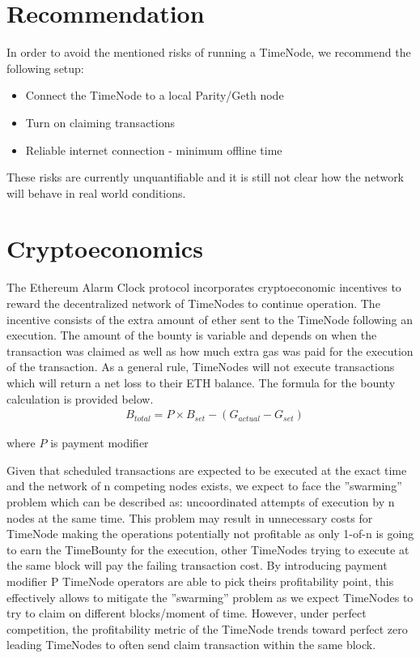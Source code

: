 \documentclass{report}
\begin{document}
  \section{Recommendation}
  In order to avoid the mentioned risks of running a TimeNode, we recommend the following setup:
  \begin{itemize}
    \item Connect the TimeNode to a local Parity/Geth node
    \item Turn on claiming transactions
    \item Reliable internet connection - minimum offline time
  \end{itemize}

  These risks are currently unquantifiable and it is still not clear how the network will behave in real world conditions.

  \section{Cryptoeconomics}
  The Ethereum Alarm Clock protocol incorporates cryptoeconomic incentives to reward the decentralized network of TimeNodes to continue operation. The incentive consists of the extra amount of ether sent to the TimeNode following an execution. The amount of the bounty is variable and depends on when the transaction was claimed as well as how much extra gas was paid for the execution of the transaction. As a general rule, TimeNodes will not execute transactions which will return a net loss to their ETH balance. The formula for the bounty calculation is provided below.
  \begin{align*}
    &B_{total} = P \times B_{set} - (G_{actual} - G_{set})
  \end{align*}

  where $P$ is payment modifier

  Given that scheduled transactions are expected to be executed at the exact time and the network of n competing nodes exists, we expect to face the ”swarming” problem which can be described as: uncoordinated attempts of execution by n nodes at the same time. This problem may result in unnecessary costs for TimeNode making the operations potentially not profitable as only 1-of-n is going to earn the TimeBounty for the execution, other TimeNodes trying to execute at the same block will pay the failing transaction cost. By introducing payment modifier P TimeNode operators are able to pick theirs profitability point, this effectively allows to mitigate the ”swarming” problem as we expect TimeNodes to try to claim on different blocks/moment of time. However, under perfect competition, the profitability metric of the TimeNode trends toward perfect zero leading TimeNodes to often send claim transaction within the same block.
\end{document}
